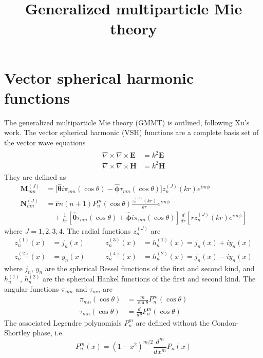 \documentclass[11pt]{article}
\title{Generalized multiparticle Mie theory}
\date{}
\author{}
\begin{document}
\maketitle

\section{Vector spherical harmonic functions}

The generalized multiparticle Mie theory (GMMT) is outlined, following Xu's work. \cite{xu1995electromagnetic}
The vector spherical harmonic (VSH) functions are a complete basis set of the vector wave equations
\begin{align}
    \begin{split}
        \nabla \times \nabla \times \boldsymbol{E} &= k^2 \boldsymbol{E} \\
        \nabla \times \nabla \times \boldsymbol{H} &= k^2 \boldsymbol{H}
    \end{split}
\end{align}
They are defined as
\begin{align}
    \boldsymbol{M}_{mn}^{(J)} &= \big[
    \boldsymbol{\hat \theta} i\pi_{mn}(\cos\theta) 
   -\boldsymbol{\hat \phi} \tau_{mn}(\cos\theta) \big] z_n^{(J)}(kr) e^{im\phi} \\
    \boldsymbol{N}_{mn}^{(J)} &= 
    \boldsymbol{\hat r} n(n+1) P_n^m(\cos\theta) \frac{z_n^{(J)}(kr)}{kr}e^{im\phi} \\
    &\quad + \frac{1}{kr} \left[ \boldsymbol{\hat \theta} \tau_{mn}(\cos\theta) + \boldsymbol{\hat \phi} i\pi_{mn}(\cos\theta) \right]
    \frac{d}{dr} \left[ rz_n^{(J)}(kr)e^{im\phi} \right] \nonumber
\end{align}
where $J= 1,2,3,4$. The radial functions $z_n^{(J)}$ are
\begin{equation}
\begin{align*}
    z_n^{(1)}(x) &= j_n(x)  \qquad&  z_n^{(3)}(x) &= h_n^{(1)}(x) = j_n(x) + iy_n(x)   \\
    z_n^{(2)}(x) &= y_n(x)  \qquad&  z_n^{(4)}(x) &= h_n^{(2)}(x) = j_n(x) - iy_n(x)
\end{align*}
\end{equation}
where $j_n$, $y_n$ are the spherical Bessel functions of the first and second kind, and $h_n^{(1)}$, $h_n^{(2)}$ are the spherical Hankel functions of the first and second kind.
The angular functions $\pi_{mn}$ and $\tau_{mn}$ are
\begin{align}
    \pi_{mn}(\cos\theta) &= \frac{m}{\sin\theta} P_n^m(\cos\theta) \\
    \tau_{mn}(\cos\theta) &= \frac{d}{d\theta} P_n^m(\cos\theta) 
\end{align}
The associated Legendre polynomials $P_n^m$ are defined without the Condon-Shortley phase, i.e.
\begin{equation}
    P_n^m(x) = (1 - x^2)^{m/2} \frac{d^m}{dx^m} P_n(x)
\end{equation}
\end{document}
